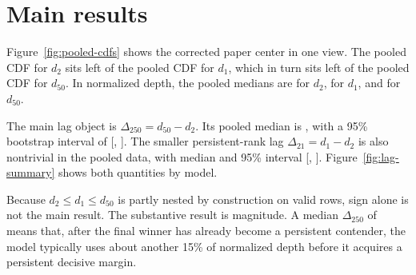 \section{Main results}

Figure~\ref{fig:pooled-cdfs} shows the corrected paper center in one view. The pooled CDF for $d_2$ sits left of the pooled CDF for $d_1$, which in turn sits left of the pooled CDF for $d_{50}$. In normalized depth, the pooled medians are \PooledMedianDTwo{} for $d_2$, \PooledMedianDOne{} for $d_1$, and \PooledMedianDFifty{} for $d_{50}$.

The main lag object is $\Delta_{250} = d_{50} - d_2$. Its pooled median is \PooledMedianDeltaTwentyFifty{}, with a 95\% bootstrap interval of [\PooledDeltaTwentyFiftyLow{}, \PooledDeltaTwentyFiftyHigh{}]. The smaller persistent-rank lag $\Delta_{21} = d_1 - d_2$ is also nontrivial in the pooled data, with median \PooledMedianDeltaTwentyOne{} and 95\% interval [\PooledDeltaTwentyOneLow{}, \PooledDeltaTwentyOneHigh{}]. Figure~\ref{fig:lag-summary} shows both quantities by model.

Because $d_2 \le d_1 \le d_{50}$ is partly nested by construction on valid rows, sign alone is not the main result. The substantive result is magnitude. A median $\Delta_{250}$ of \PooledDeltaTwoFiftyPct{} means that, after the final winner has already become a persistent contender, the model typically uses about another 15\% of normalized depth before it acquires a persistent decisive margin.
